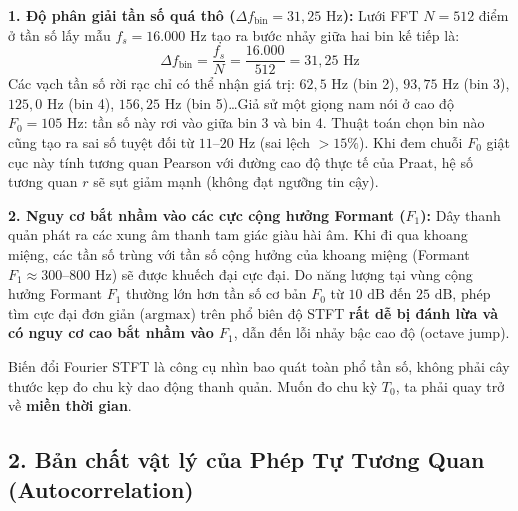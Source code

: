 \documentclass[11pt,a4paper]{article}
\begin{document}
\textbf{1. Độ phân giải tần số quá thô ($\Delta f_{\text{bin}} = 31{,}25\text{ Hz}$):}
Lưới FFT $N = 512$ điểm ở tần số lấy mẫu $f_s = 16.000\text{ Hz}$ tạo ra bước nhảy giữa hai bin kế tiếp là:
\[
\Delta f_{\text{bin}} = \frac{f_s}{N} = \frac{16.000}{512} = 31{,}25\text{ Hz}
\]
Các vạch tần số rời rạc chỉ có thể nhận giá trị: $62{,}5\text{ Hz}$ (bin 2), $93{,}75\text{ Hz}$ (bin 3), $125{,}0\text{ Hz}$ (bin 4), $156{,}25\text{ Hz}$ (bin 5)\dots Giả sử một giọng nam nói ở cao độ $F_0 = 105\text{ Hz}$: tần số này rơi vào giữa bin 3 và bin 4. Thuật toán chọn bin nào cũng tạo ra sai số tuyệt đối từ $11\text{--}20\text{ Hz}$ (sai lệch $> 15\%$). Khi đem chuỗi $F_0$ giật cục này tính tương quan Pearson với đường cao độ thực tế của Praat, hệ số tương quan $r$ sẽ sụt giảm mạnh (không đạt ngưỡng tin cậy).

\textbf{2. Nguy cơ bắt nhầm vào các cực cộng hưởng Formant ($F_1$):}
Dây thanh quản phát ra các xung âm thanh tam giác giàu hài âm. Khi đi qua khoang miệng, các tần số trùng với tần số cộng hưởng của khoang miệng (Formant $F_1 \approx 300\text{--}800\text{ Hz}$) sẽ được khuếch đại cực đại. Do năng lượng tại vùng cộng hưởng Formant $F_1$ thường lớn hơn tần số cơ bản $F_0$ từ $10\text{ dB}$ đến $25\text{ dB}$, phép tìm cực đại đơn giản ($\text{argmax}$) trên phổ biên độ STFT \textbf{rất dễ bị đánh lừa và có nguy cơ cao bắt nhầm vào $F_1$}, dẫn đến lỗi nhảy bậc cao độ (octave jump).

\begin{physicalinsight}
Biến đổi Fourier STFT là công cụ nhìn bao quát toàn phổ tần số, không phải cây thước kẹp đo chu kỳ dao động thanh quản. Muốn đo chu kỳ $T_0$, ta phải quay trở về \textbf{miền thời gian}.
\end{physicalinsight}

\subsection*{2. Bản chất vật lý của Phép Tự Tương Quan (Autocorrelation)}
\end{document}
